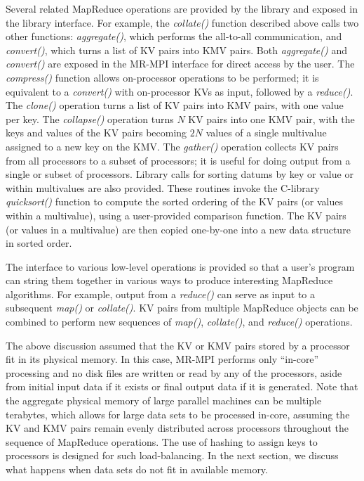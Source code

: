 Several related MapReduce operations are provided by the library and
exposed in the library interface.  For example, the {\it collate()} function
described above
calls two other functions:  {\it aggregate()}, which performs the all-to-all
communication, and {\it convert()}, which turns a list of KV pairs into
KMV pairs.  
Both {\it aggregate()} and {\it convert()} are exposed in the MR-MPI
interface for direct access by the user.
The {\it compress()} function allows on-processor operations to be 
performed; it is equivalent to a {\it convert()} with on-processor KVs as
input, followed by a {\it reduce()}.  
The {\it clone()} operation turns a list of KV pairs into
KMV pairs, with one value per key.  The {\it collapse()} operation turns
$N$ KV pairs into one KMV pair, with the keys and values of the KV
pairs becoming $2N$ values of a single multivalue assigned to a new
key on the KMV.  The {\it gather()} operation collects KV pairs from
all processors to a subset of processors; it is useful for doing
output from a single or subset of processors.  Library calls for
sorting datums by key or value or within multivalues are also
provided.  These routines invoke the C-library {\it quicksort()} function to
compute the sorted ordering of the KV pairs (or values within a
multivalue), using a user-provided comparison function.  The KV pairs
(or values in a multivalue) are then copied one-by-one into a new data
structure in sorted order.

The interface to various low-level operations is provided so
that a user's program can string them together in various ways to
produce interesting MapReduce algorithms.  For example, output from a
{\it reduce()} can serve as input to a subsequent {\it map()} or {\it
collate()}.  KV pairs from multiple MapReduce objects can be combined
to perform new sequences of {\it map()}, {\it collate()}, and
{\it reduce()} operations.

The above discussion assumed that the KV or KMV pairs stored by a
processor fit in its physical memory.  In this case, MR-MPI 
performs only ``in-core'' processing and no disk files are written
or read by any of the processors, aside from initial input data if it
exists or final output data if it is generated.  Note that the
aggregate physical memory of large parallel machines can be multiple
terabytes, which allows for large data sets to be processed in-core,
assuming the KV and KMV pairs remain evenly distributed across
processors throughout the sequence of MapReduce operations.  The use
of hashing to assign keys to processors is designed for
such load-balancing.  In the next section, we discuss what happens 
when data sets do not fit in available memory.
